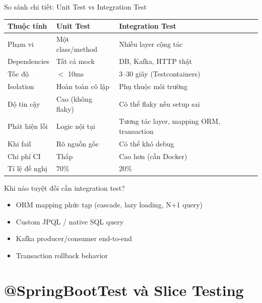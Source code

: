 \documentclass[aspectratio=169,10pt]{beamer}
\begin{document}
\begin{frame}{So sánh chi tiết: Unit Test vs Integration Test}
  \begin{center}
  \small
  \begin{tabular}{p{2.5cm}p{3.5cm}p{4.5cm}}
    \toprule
    \textbf{Thuộc tính} & \textbf{Unit Test} & \textbf{Integration Test} \\
    \midrule
    Phạm vi          & Một class/method & Nhiều layer cộng tác \\
    Dependencies     & Tất cả mock       & DB, Kafka, HTTP thật \\
    Tốc độ           & $<$ 10ms          & 3--30 giây (Testcontainers) \\
    Isolation        & Hoàn toàn cô lập  & Phụ thuộc môi trường \\
    Độ tin cậy       & Cao (không flaky) & Có thể flaky nếu setup sai \\
    Phát hiện lỗi    & Logic nội tại     & Tương tác layer, mapping ORM, transaction \\
    Khi fail         & Rõ nguồn gốc      & Có thể khó debug \\
    Chi phí CI       & Thấp              & Cao hơn (cần Docker) \\
    \midrule
    Tỉ lệ đề nghị   & 70\%              & 20\% \\
    \bottomrule
  \end{tabular}
  \end{center}

  \vspace{0.3em}
  \begin{exampleblock}{Khi nào tuyệt đối cần integration test?}
    \begin{itemize}
      \item ORM mapping phức tạp (cascade, lazy loading, N+1 query)
      \item Custom JPQL / native SQL query
      \item Kafka producer/consumer end-to-end
      \item Transaction rollback behavior
    \end{itemize}
  \end{exampleblock}
\end{frame}

\section{@SpringBootTest và Slice Testing}
\end{document}

